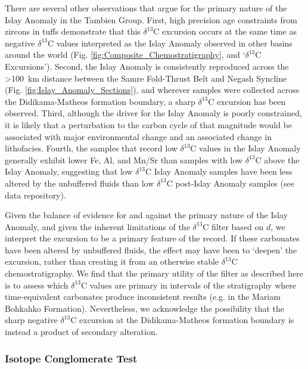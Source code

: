 \documentclass[11pt,letterpaper]{article}
\newcommand{\dC}{$\delta^{13}$C\xspace}
\newcommand{\dsil}{$d$\xspace}
\begin{document}
There are several other observations that argue for the primary nature of the Islay Anomaly in the Tambien Group. First, high precision age constraints from zircons in tuffs demonstrate that this \dC excursion occurs at the same time as negative \dC values interpreted as the Islay Anomaly observed in other basins around the world (Fig. \ref{fig:Composite_Chemostratigraphy}, and `\dC Excursions'). Second, the Islay Anomaly is consistently reproduced across the \textgreater100~km distance between the Samre Fold-Thrust Belt and Negash Syncline (Fig. \ref{fig:Islay_Anomaly_Sections}), and wherever samples were collected across the Didikama-Matheos formation boundary, a sharp \dC excursion has been observed. Third, although the driver for the Islay Anomaly is poorly constrained, it is likely that a perturbation to the carbon cycle of that magnitude would be associated with major environmental change and an associated change in lithofacies. Fourth, the samples that record low \dC values in the Islay Anomaly generally exhibit lower Fe, Al, and Mn/Sr than samples with low \dC above the Islay Anomaly, suggesting that low \dC Islay Anomaly samples have been less altered by the unbuffered fluids than low \dC post-Islay Anomaly samples (see data repository).

Given the balance of evidence for and against the primary nature of the Islay Anomaly, and given the inherent limitations of the \dC filter based on \dsil, we interpret the excursion to be a primary feature of the record. If these carbonates have been altered by unbuffered fluids, the effect may have been to `deepen' the excursion, rather than creating it from an otherwise stable \dC chemostratigraphy. We find that the primary utility of the filter as described here is to assess which \dC values are primary in intervals of the stratigraphy where time-equivalent carbonates produce inconsistent results (e.g. in the Mariam Bohkahko Formation). Nevertheless, we acknowledge the possibility that the sharp negative \dC excursion at the Didikama-Matheos formation boundary is instead a product of secondary alteration.

\subsubsection*{Isotope Conglomerate Test}
\end{document}
